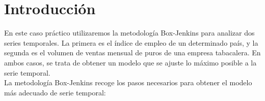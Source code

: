 \documentclass[12pt,a4paper,twoside,openright,titlepage,final]{article}
\author{José Ignacio Escribano}
\title{}
\begin{document}
\setcounter{page}{1}


\tableofcontents
\thispagestyle{empty}
\newpage

\listoffigures
\thispagestyle{empty}
\newpage

\listoftables
\thispagestyle{empty}
\newpage

\setcounter{page}{1}

\section{Introducción}

En este caso práctico utilizaremos la metodología Box-Jenkins para analizar dos series temporales. La primera es el índice de empleo de un determinado país, y la segunda es el volumen de ventas mensual de puros de una empresa tabacalera. En ambos casos, se trata de obtener un modelo que se ajuste lo máximo posible a la serie temporal.\\

La metodología Box-Jenkins recoge los pasos necesarios para obtener el modelo más adecuado de serie temporal:
\end{document}
